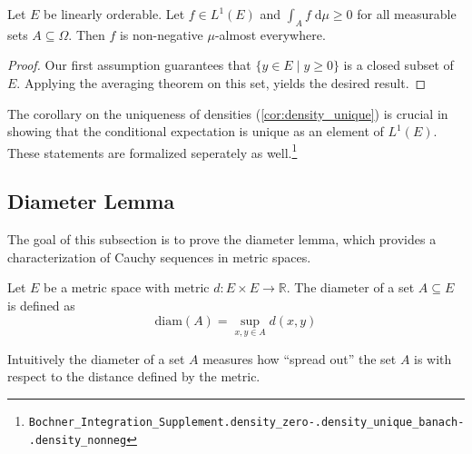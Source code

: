 \begin{corollary}
	Let $E$ be linearly orderable. Let $f \in L^1(E)$ and $\int_A f \;\textrm{d}\mu \ge 0$ for all measurable sets $A \subseteq \Omega$. Then $f$ is non-negative $\mu$-almost everywhere.
\end{corollary}
\begin{proof}
	Our first assumption guarantees that $\{ y \in E \;\vert\; y \ge 0 \}$ is a closed subset of $E$. Applying the averaging theorem on this set, yields the desired result.
\end{proof}

The corollary on the uniqueness of densities (\ref{cor:density_unique}) is crucial in showing that the conditional expectation is unique as an element of $L^1(E)$. These statements are formalized seperately as well.\footnote{\texttt{Bochner\_Integration\_Supplement.density\_zero}\quad \texttt{-.density\_unique\_banach}\quad \texttt{-.density\_nonneg}}

\subsection{Diameter Lemma}

The goal of this subsection is to prove the diameter lemma, which provides a characterization of Cauchy sequences in metric spaces.

\begin{definition}
Let $E$ be a metric space with metric $d : E \times E \rightarrow \mathbb{R}$. The diameter of a set $A \subseteq E$ is defined as
\[
	\textrm{diam}(A) = \sup_{x,y \in A} d(x,y)
\]
\end{definition}

Intuitively the diameter of a set $A$ measures how ``spread out'' the set $A$ is with respect to the distance defined by the metric.

